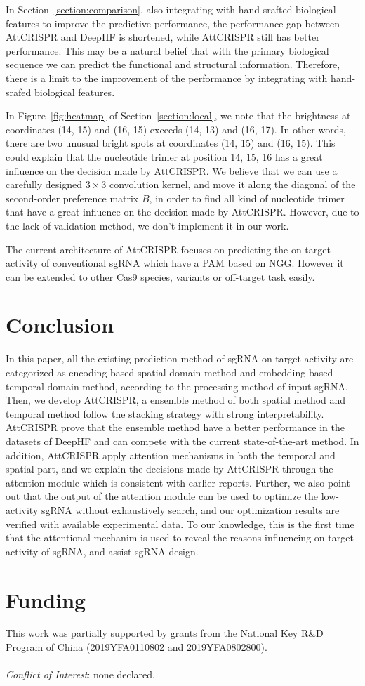 \documentclass{bioinfo}
\begin{document}
In Section~\ref{section:comparison}, also integrating with hand-srafted biological features to improve the predictive performance, the performance gap between AttCRISPR and DeepHF is shortened, while AttCRISPR still has better performance. 
This may be a natural belief that with the primary biological sequence we can predict the functional and structural information. 
Therefore, there is a limit to the improvement of the performance by integrating with hand-srafed biological features. 

In Figure~\ref{fig:heatmap} of Section~\ref{section:local}, we note that the brightness at coordinates (14, 15) and (16, 15) exceeds (14, 13) and (16, 17). 
In other words, there are two unusual bright spots at coordinates (14, 15) and (16, 15). 
This could explain that the nucleotide trimer at position 14, 15, 16 has a great influence on the decision made by AttCRISPR. 
We believe that we can use a carefully designed $3\times 3$ convolution kernel, and move it along the diagonal of the second-order preference matrix $B$, 
in order to find all kind of nucleotide trimer that have a great influence on the decision made by AttCRISPR. 
However, due to the lack of validation method, we don't implement it in our work. 

The current architecture of AttCRISPR focuses on predicting the on-target activity of conventional sgRNA which have a PAM based on NGG. 
However it can be extended to other Cas9 species, variants or off-target task easily. 

\section{Conclusion}

In this paper, all the existing prediction method of sgRNA on-target activity are categorized as encoding-based spatial domain method and embedding-based temporal domain method, 
according to the processing method of input sgRNA. 
Then, we develop AttCRISPR, a ensemble method of both spatial method and temporal method follow the stacking strategy with strong interpretability. 
AttCRISPR prove that the ensemble method have a better performance in the datasets of DeepHF
and can compete with the current state-of-the-art method. 
In addition, AttCRISPR apply attention mechanisms in both the temporal and spatial part, 
and we explain the decisions made by AttCRISPR through the attention module which is consistent with earlier reports. 
Further, we also point out that the output of the attention module can be used to optimize the low-activity sgRNA without exhaustively search, 
and our optimization results are verified with available experimental data. 
To our knowledge, this is the first time that the attentional mechanim is used to reveal the reasons influencing on-target activity of sgRNA, and assist sgRNA design.  


\section*{Funding}

This work was partially supported by grants from the National Key R\&D Program of China (2019YFA0110802 and 2019YFA0802800).
\\\\\emph{Conflict of Interest}: none declared.\vspace*{-12pt}



\end{document}
